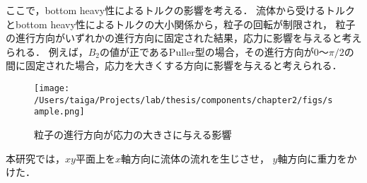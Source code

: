 \noindent
ここで，bottom heavy性によるトルクの影響を考える．
流体から受けるトルクとbottom heavy性によるトルクの大小関係から，粒子の回転が制限され，
粒子の進行方向がいずれかの進行方向に固定された結果，応力に影響を与えると考えられる．
例えば，$B_2$の値が正であるPuller型の場合，その進行方向が$0 〜 \pi / 2$の間に固定された場合，応力を大きくする方向に影響を与えると考えられる．

    \begin{figure}[htbp]
        \texttt{[image: /Users/taiga/Projects/lab/thesis/components/chapter2/figs/sample.png]}
        \caption{粒子の進行方向が応力の大きさに与える影響}
        \label{fig:graph_particle_stresslet2}
    \end{figure}

\noindent
本研究では，$xy$平面上を$x$軸方向に流体の流れを生じさせ，
$y$軸方向に重力をかけた．
